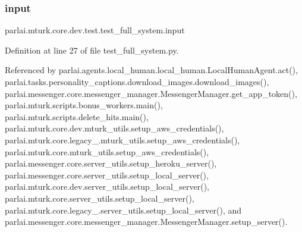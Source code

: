 \mbox{\label{namespaceparlai_1_1mturk_1_1core_1_1dev_1_1test_1_1test__full__system_a1e1817cd65688fb90f827834d1fb4567}} 
\subsubsection{\texorpdfstring{input}{input}}
{\footnotesize\ttfamily parlai.\+mturk.\+core.\+dev.\+test.\+test\+\_\+full\+\_\+system.\+input}



Definition at line 27 of file test\+\_\+full\+\_\+system.\+py.



Referenced by parlai.\+agents.\+local\+\_\+human.\+local\+\_\+human.\+Local\+Human\+Agent.\+act(), parlai.\+tasks.\+personality\+\_\+captions.\+download\+\_\+images.\+download\+\_\+images(), parlai.\+messenger.\+core.\+messenger\+\_\+manager.\+Messenger\+Manager.\+get\+\_\+app\+\_\+token(), parlai.\+mturk.\+scripts.\+bonus\+\_\+workers.\+main(), parlai.\+mturk.\+scripts.\+delete\+\_\+hits.\+main(), parlai.\+mturk.\+core.\+dev.\+mturk\+\_\+utils.\+setup\+\_\+aws\+\_\+credentials(), parlai.\+mturk.\+core.\+legacy\+\_.\+mturk\+\_\+utils.\+setup\+\_\+aws\+\_\+credentials(), parlai.\+mturk.\+core.\+mturk\+\_\+utils.\+setup\+\_\+aws\+\_\+credentials(), parlai.\+messenger.\+core.\+server\+\_\+utils.\+setup\+\_\+heroku\+\_\+server(), parlai.\+messenger.\+core.\+server\+\_\+utils.\+setup\+\_\+local\+\_\+server(), parlai.\+mturk.\+core.\+dev.\+server\+\_\+utils.\+setup\+\_\+local\+\_\+server(), parlai.\+mturk.\+core.\+server\+\_\+utils.\+setup\+\_\+local\+\_\+server(), parlai.\+mturk.\+core.\+legacy\+\_.\+server\+\_\+utils.\+setup\+\_\+local\+\_\+server(), and parlai.\+messenger.\+core.\+messenger\+\_\+manager.\+Messenger\+Manager.\+setup\+\_\+server().

\mbox{\label{namespaceparlai_1_1mturk_1_1core_1_1dev_1_1test_1_1test__full__system_ac2c9f7fc20b4d937b9728cf9300db765}} 
